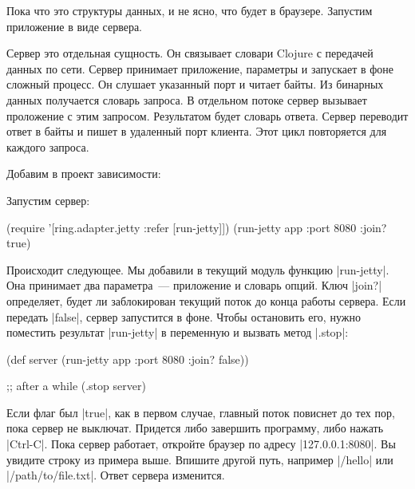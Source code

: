 Пока что это структуры данных, и не ясно, что будет в браузере. Запустим
приложение в виде сервера.

Сервер это отдельная сущность. Он связывает словари Clojure с передачей данных
по сети. Сервер принимает приложение, параметры и запускает в фоне сложный
процесс. Он слушает указанный порт и читает байты. Из бинарных данных получается
словарь запроса. В отдельном потоке сервер вызывает проложение с этим
запросом. Результатом будет словарь ответа. Сервер переводит ответ в байты и
пишет в удаленный порт клиента. Этот цикл повторяется для каждого запроса.

Добавим в проект зависимости:

\begin{english}
  \begin{clojure}
  \end{clojure}
\end{english}

Запустим сервер:

\begin{english}
  \begin{clojure}
(require '[ring.adapter.jetty :refer [run-jetty]])
(run-jetty app {:port 8080 :join? true})
  \end{clojure}
\end{english}

Происходит следующее. Мы добавили в текущий модуль функцию
\spverb|run-jetty|. Она принимает два параметра~--- приложение и словарь
опций. Ключ \spverb|join?| определяет, будет ли заблокирован текущий поток до
конца работы сервера. Если передать \spverb|false|, сервер запустится в
фоне. Чтобы остановить его, нужно поместить результат \spverb|run-jetty| в
переменную и вызвать метод \spverb|.stop|:

\begin{english}
  \begin{clojure}
(def server
  (run-jetty app {:port 8080 :join? false}))

;; after a while
(.stop server)
  \end{clojure}
\end{english}

Если флаг был \spverb|true|, как в первом случае, главный поток повиснет до тех
пор, пока сервер не выключат. Придется либо завершить программу, либо нажать
\spverb|Ctrl-C|. Пока сервер работает, откройте браузер по адресу
\spverb|127.0.0.1:8080|. Вы увидите строку из примера выше. Впишите другой путь,
например \spverb|/hello| или \spverb|/path/to/file.txt|. Ответ сервера
изменится.

